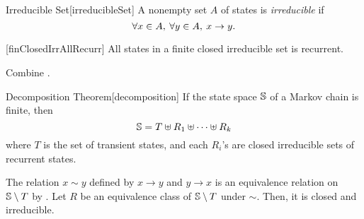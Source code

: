 \documentclass[../probability.tex]{subfiles}
\begin{document}
\begin{Definition}{Irreducible Set}[irreducibleSet]
    A nonempty set \(A\) of states is \emph{irreducible} if
    \[
        \forall x \in A,\: \forall y \in A,\: x \to y\text.
    \]
\end{Definition}

\begin{Theorem}{}[finClosedIrrAllRecurr]
    All states in a finite closed irreducible set is recurrent.
\end{Theorem}
\begin{myproof}[Proof]
    Combine \text.
\end{myproof}

\begin{Theorem}{Decomposition Theorem}[decomposition]
    If the state space \(\mathbb{S}\) of a Markov chain is finite, then
    \[
        \mathbb{S} = T \uplus R_1 \uplus \cdots \uplus R_k
    \]
    where \(T\) is the set of transient states,
    and each \(R_i\)'s are closed irreducible sets of recurrent states.
\end{Theorem}
\begin{myproof}[Proof]
    The relation \(x \sim y\) defined by \(x \to y\) and \(y \to x\) is an equivalence relation
    on \(\mathbb{S} \setminus T\) by .
    Let \(R\) be an equivalence class of \(\mathbb{S} \setminus T\) under \(\sim\).
    Then, it is closed and irreducible.
\end{myproof}
\end{document}
